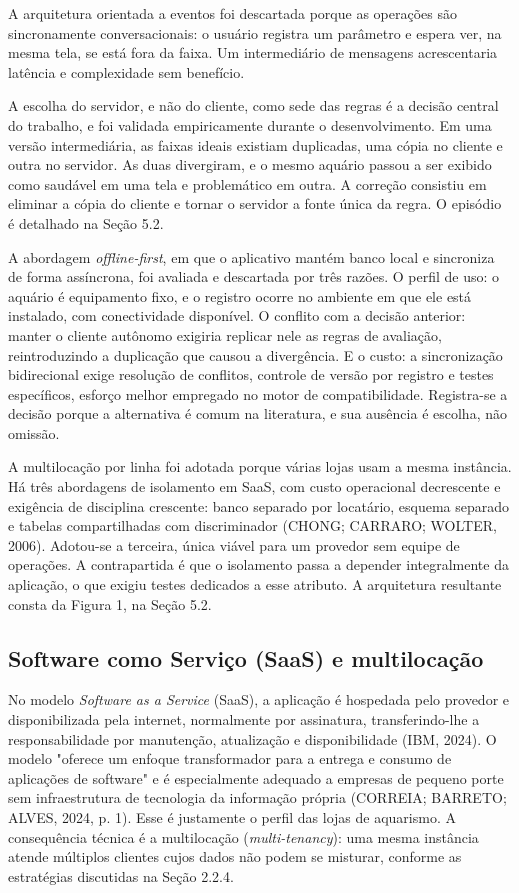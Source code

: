 \documentclass[12pt,oneside,a4paper,brazilian]{abntex2}
\begin{document}
A arquitetura orientada a eventos foi descartada porque as operações são sincronamente conversacionais: o usuário registra um parâmetro e espera ver, na mesma tela, se está fora da faixa. Um intermediário de mensagens acrescentaria latência e complexidade sem benefício.

A escolha do servidor, e não do cliente, como sede das regras é a decisão central do trabalho, e foi validada empiricamente durante o desenvolvimento. Em uma versão intermediária, as faixas ideais existiam duplicadas, uma cópia no cliente e outra no servidor. As duas divergiram, e o mesmo aquário passou a ser exibido como saudável em uma tela e problemático em outra. A correção consistiu em eliminar a cópia do cliente e tornar o servidor a fonte única da regra. O episódio é detalhado na Seção 5.2.

A abordagem \textit{offline-first}, em que o aplicativo mantém banco local e sincroniza de forma assíncrona, foi avaliada e descartada por três razões. O perfil de uso: o aquário é equipamento fixo, e o registro ocorre no ambiente em que ele está instalado, com conectividade disponível. O conflito com a decisão anterior: manter o cliente autônomo exigiria replicar nele as regras de avaliação, reintroduzindo a duplicação que causou a divergência. E o custo: a sincronização bidirecional exige resolução de conflitos, controle de versão por registro e testes específicos, esforço melhor empregado no motor de compatibilidade. Registra-se a decisão porque a alternativa é comum na literatura, e sua ausência é escolha, não omissão.

A multilocação por linha foi adotada porque várias lojas usam a mesma instância. Há três abordagens de isolamento em SaaS, com custo operacional decrescente e exigência de disciplina crescente: banco separado por locatário, esquema separado e tabelas compartilhadas com discriminador (CHONG; CARRARO; WOLTER, 2006). Adotou-se a terceira, única viável para um provedor sem equipe de operações. A contrapartida é que o isolamento passa a depender integralmente da aplicação, o que exigiu testes dedicados a esse atributo. A arquitetura resultante consta da Figura 1, na Seção 5.2.


\subsection{Software como Serviço (SaaS) e multilocação}
No modelo \textit{Software as a Service} (SaaS), a aplicação é hospedada pelo provedor e disponibilizada pela internet, normalmente por assinatura, transferindo-lhe a responsabilidade por manutenção, atualização e disponibilidade (IBM, 2024). O modelo "oferece um enfoque transformador para a entrega e consumo de aplicações de software" e é especialmente adequado a empresas de pequeno porte sem infraestrutura de tecnologia da informação própria (CORREIA; BARRETO; ALVES, 2024, p. 1). Esse é justamente o perfil das lojas de aquarismo. A consequência técnica é a multilocação (\textit{multi-tenancy}): uma mesma instância atende múltiplos clientes cujos dados não podem se misturar, conforme as estratégias discutidas na Seção 2.2.4.
\end{document}

